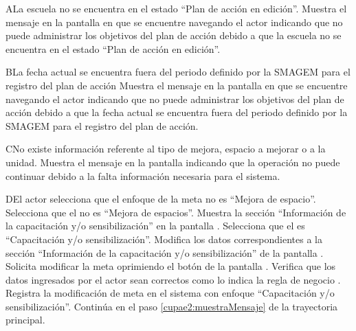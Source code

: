 \begin{UCtrayectoriaA}{A}{La escuela no se encuentra en el estado ``Plan de acción en edición''.}
    \UCpaso[\UCsist] Muestra el mensaje  en la pantalla en que se encuentre navegando el actor indicando que no puede administrar los objetivos del plan de acción debido a que la escuela no se encuentra en el estado ``Plan de acción en edición''. 
 \end{UCtrayectoriaA}
 
   \begin{UCtrayectoriaA}{B}{La fecha actual se encuentra fuera del periodo definido por la SMAGEM para el registro del plan de acción}
    \UCpaso[\UCsist] Muestra el mensaje  en la pantalla en que se encuentre navegando el actor indicando que no puede administrar los objetivos del plan de acción debido a que la fecha actual se encuentra fuera del periodo definido por la SMAGEM para el registro del plan de acción.
 \end{UCtrayectoriaA}
  
 
 
\begin{UCtrayectoriaA}{C}{No existe información referente al tipo de mejora, espacio a mejorar o a la unidad.}
	\UCpaso[\UCsist] Muestra el mensaje  en la pantalla  indicando que la operación no puede continuar debido a la falta información necesaria para el sistema.
\end{UCtrayectoriaA}

\begin{UCtrayectoriaA}{D}{El actor selecciona que el enfoque de la meta no es ``Mejora de espacio''.}
	\UCpaso[\UCactor] Selecciona que el  no es ``Mejora de espacios''. 
	\UCpaso[\UCsist] Muestra la sección ``Información de la capacitación y/o sensibilización'' en la pantalla .
	\UCpaso[\UCactor] Selecciona que el  es ``Capacitación y/o sensibilización''. 
	\UCpaso[\UCactor] Modifica los datos correspondientes a la sección ``Información de la capacitación y/o sensibilización'' de la pantalla .
	\UCpaso[\UCactor] Solicita modificar la meta oprimiendo el botón  de la pantalla .  
	\UCpaso[\UCsist] Verifica que los datos ingresados por el actor sean correctos como lo indica la regla de negocio .   
	\UCpaso[\UCsist] Registra la modificación de meta en el sistema con enfoque ``Capacitación y/o sensibilización''.
	\UCpaso[] Continúa en el paso \ref{cupae2:muestraMensaje} de la trayectoria principal.
\end{UCtrayectoriaA}

